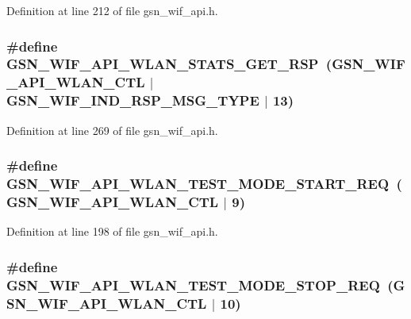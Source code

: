 Definition at line 212 of file gsn\_\-wif\_\-api.h.

\hypertarget{a00606_a5d9598cf8c8aacd7bd4887f177b6ab47}{
\subsubsection[{GSN\_\-WIF\_\-API\_\-WLAN\_\-STATS\_\-GET\_\-RSP}]{\setlength{\rightskip}{0pt plus 5cm}\#define GSN\_\-WIF\_\-API\_\-WLAN\_\-STATS\_\-GET\_\-RSP~(GSN\_\-WIF\_\-API\_\-WLAN\_\-CTL $|$ GSN\_\-WIF\_\-IND\_\-RSP\_\-MSG\_\-TYPE $|$ 13)}}
\label{a00606_a5d9598cf8c8aacd7bd4887f177b6ab47}


Definition at line 269 of file gsn\_\-wif\_\-api.h.

\hypertarget{a00606_af97f692c14b16848867464de9e30345b}{
\subsubsection[{GSN\_\-WIF\_\-API\_\-WLAN\_\-TEST\_\-MODE\_\-START\_\-REQ}]{\setlength{\rightskip}{0pt plus 5cm}\#define GSN\_\-WIF\_\-API\_\-WLAN\_\-TEST\_\-MODE\_\-START\_\-REQ~(GSN\_\-WIF\_\-API\_\-WLAN\_\-CTL $|$ 9)}}
\label{a00606_af97f692c14b16848867464de9e30345b}


Definition at line 198 of file gsn\_\-wif\_\-api.h.

\hypertarget{a00606_a9a723d579a54011634bea28aba7c79ab}{
\subsubsection[{GSN\_\-WIF\_\-API\_\-WLAN\_\-TEST\_\-MODE\_\-STOP\_\-REQ}]{\setlength{\rightskip}{0pt plus 5cm}\#define GSN\_\-WIF\_\-API\_\-WLAN\_\-TEST\_\-MODE\_\-STOP\_\-REQ~(GSN\_\-WIF\_\-API\_\-WLAN\_\-CTL $|$ 10)}}
\label{a00606_a9a723d579a54011634bea28aba7c79ab}



